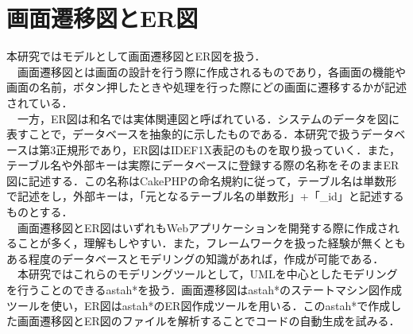 \documentclass{funthesis}
\begin{document}
\section{画面遷移図とER図}
本研究ではモデルとして画面遷移図とER図を扱う．\\　画面遷移図とは画面の設計を行う際に作成されるものであり，各画面の機能や画面の名前，ボタン押したときや処理を行った際にどの画面に遷移するかが記述されている．\\
　一方，ER図は和名では実体関連図と呼ばれている．システムのデータを図に表すことで，データベースを抽象的に示したものである．本研究で扱うデータベースは第3正規形であり，ER図はIDEF1X表記のものを取り扱っていく．また，テーブル名や外部キーは実際にデータベースに登録する際の名称をそのままER図に記述する．この名称はCakePHPの命名規約に従って，テーブル名は単数形で記述をし，外部キーは，「元となるテーブル名の単数形」+「\_id」と記述するものとする．\\%
　画面遷移図とER図はいずれもWebアプリケーションを開発する際に作成されることが多く，理解もしやすい．また，フレームワークを扱った経験が無くともある程度のデータベースとモデリングの知識があれば，作成が可能である．\\　本研究ではこれらのモデリングツールとして，UMLを中心としたモデリングを行うことのできるastah*を扱う．画面遷移図はastah*のステートマシン図作成ツールを使い，ER図はastah*のER図作成ツールを用いる．このastah*で作成した画面遷移図とER図のファイルを解析することでコードの自動生成を試みる．
\end{document}
